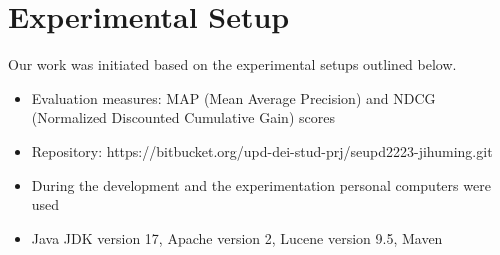 \section{Experimental Setup}
\label{sec:setup}

Our work was initiated based on the experimental setups outlined below.
\begin{itemize}
	\item Evaluation measures: MAP (Mean Average Precision) and NDCG (Normalized Discounted Cumulative Gain) scores
	\item Repository: https://bitbucket.org/upd-dei-stud-prj/seupd2223-jihuming.git 
	\item During the development and the experimentation personal computers were used
	\item Java JDK version 17, Apache version 2, Lucene version 9.5, Maven
\end{itemize}